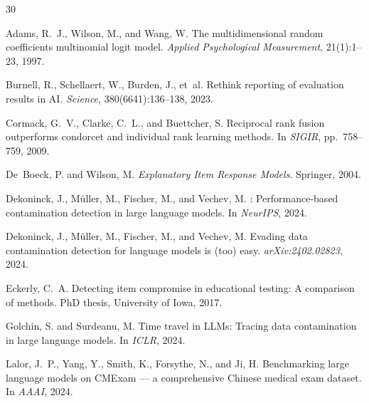 \documentclass[letterpaper]{article}
\begin{document}
{\small


\begin{thebibliography}{30}

Adams, R.~J., Wilson, M., and Wang, W.
\newblock The multidimensional random coefficients multinomial logit model.
\newblock \emph{Applied Psychological Measurement}, 21(1):1--23, 1997.

Burnell, R., Schellaert, W., Burden, J., et~al.
\newblock Rethink reporting of evaluation results in {AI}.
\newblock \emph{Science}, 380(6641):136--138, 2023.

Cormack, G.~V., Clarke, C.~L., and Buettcher, S.
\newblock Reciprocal rank fusion outperforms condorcet and individual rank learning methods.
\newblock In \emph{SIGIR}, pp.~758--759, 2009.

De~Boeck, P. and Wilson, M.
\newblock \emph{Explanatory Item Response Models}.
\newblock Springer, 2004.

Dekoninck, J., Müller, M., Fischer, M., and Vechev, M.
: Performance-based contamination detection in large language models.
\newblock In \emph{NeurIPS}, 2024.

Dekoninck, J., Müller, M., Fischer, M., and Vechev, M.
\newblock Evading data contamination detection for language models is (too) easy.
\newblock \emph{arXiv:2402.02823}, 2024.

Eckerly, C.~A.
\newblock Detecting item compromise in educational testing: A comparison of methods.
\newblock PhD thesis, University of Iowa, 2017.

Golchin, S. and Surdeanu, M.
\newblock Time travel in {LLMs}: Tracing data contamination in large language models.
\newblock In \emph{ICLR}, 2024.

Lalor, J.~P., Yang, Y., Smith, K., Forsythe, N., and Ji, H.
\newblock Benchmarking large language models on {CMExam} --- a comprehensive {Chinese} medical exam dataset.
\newblock In \emph{AAAI}, 2024.


\end{thebibliography}}
\end{document}
